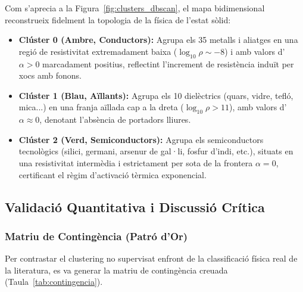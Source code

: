 \documentclass[a4paper,11pt]{article}
\begin{document}
Com s'aprecia a la Figura~\ref{fig:clusters_dbscan}, el mapa bidimensional reconstrueix fidelment la topologia de la física de l'estat sòlid:
\begin{itemize}
    \item \textbf{Clúster 0 (Ambre, Conductors):} Agrupa els 35 metalls i aliatges en una regió de resistivitat extremadament baixa ($\log_{10}\rho \sim -8$) i amb valors d'$\alpha > 0$ marcadament positius, reflectint l'increment de resistència induït per xocs amb fonons.
    \item \textbf{Clúster 1 (Blau, Aïllants):} Agrupa els 10 dielèctrics (quars, vidre, tefló, mica...) en una franja aïllada cap a la dreta ($\log_{10}\rho > 11$), amb valors d'$\alpha \approx 0$, denotant l'absència de portadors lliures.
    \item \textbf{Clúster 2 (Verd, Semiconductors):} Agrupa els semiconductors tecnològics (silici, germani, arsenur de gal·li, fosfur d'indi, etc.), situats en una resistivitat intermèdia i estrictament per sota de la frontera $\alpha = 0$, certificant el règim d'activació tèrmica exponencial.
\end{itemize}

\subsection{Validació Quantitativa i Discussió Crítica}

\subsubsection{Matriu de Contingència (Patró d'Or)}

Per contrastar el clustering no supervisat enfront de la classificació física real de la literatura, es va generar la matriu de contingència creuada (Taula~\ref{tab:contingencia}).
\end{document}
